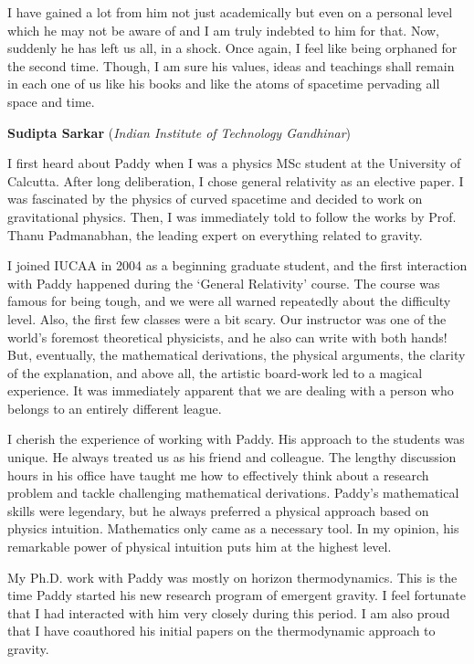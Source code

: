 \documentclass[prd, preprint, longbibliography, 11pt]{revtex4-1}
\begin{document}
I have gained a lot from him not just academically but even on a personal level which he may not be aware of and I am truly indebted to him for that. Now, suddenly he has left us all, in a shock. Once again, I feel like being orphaned for the second time. Though, I am sure his values, ideas and teachings shall remain in each one of us like his books and like the atoms of spacetime pervading all space and time. 

\bigskip

\bigskip


\centerline{{\bf Sudipta Sarkar} ({\it Indian Institute of Technology Gandhinar})}
\medskip
{}

I first heard about Paddy when I was a physics MSc student at the University of Calcutta. After long deliberation, I chose general relativity as an elective paper. I was fascinated by the physics of curved spacetime and decided to work on gravitational physics. Then, I was immediately told to follow the works by Prof. Thanu Padmanabhan, the leading expert on everything related to gravity.

I joined IUCAA in 2004 as a beginning graduate student, and the first interaction with Paddy happened during the `General Relativity' course. The course was famous for being tough, and we were all warned repeatedly about the difficulty level. Also, the first few classes were a bit scary. Our instructor was one of the world's foremost theoretical physicists, and he also can write with both hands! But, eventually, the mathematical derivations, the physical arguments, the clarity of the explanation, and above all, the artistic board-work led to a magical experience. It was immediately apparent that we are dealing with a person who belongs to an entirely different league. 

I cherish the experience of working with Paddy. His approach to the students was unique. He always treated us as his friend and colleague. The lengthy discussion hours in his office have taught me how to effectively think about a research problem and tackle challenging mathematical derivations. Paddy's mathematical skills were legendary, but he always preferred a physical approach based on physics intuition. Mathematics only came as a necessary tool.  In my opinion, his remarkable power of physical intuition puts him at the highest level.

My Ph.D. work with Paddy was mostly on horizon thermodynamics. This is the time Paddy started his new research program of emergent gravity.  I feel fortunate that I had interacted with him very closely during this period.  I am also proud that I have coauthored his initial papers on the thermodynamic approach to gravity.
\end{document}

